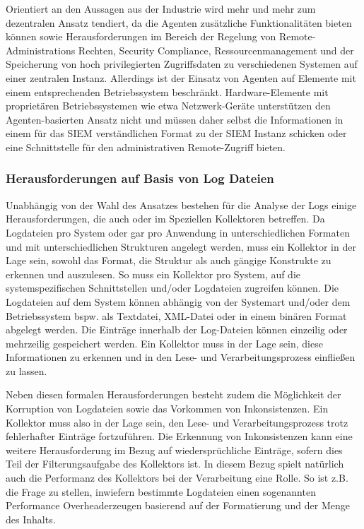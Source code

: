 Orientiert an den Aussagen aus der Industrie wird mehr und mehr zum dezentralen Ansatz tendiert, da die Agenten zusätzliche Funktionalitäten bieten können sowie Herausforderungen im Bereich der Regelung von Remote-Administrations Rechten, Security Compliance, Ressourcenmanagement und der Speicherung von hoch privilegierten Zugriffsdaten zu verschiedenen Systemen auf einer zentralen Instanz. Allerdings ist der Einsatz von Agenten auf Elemente mit einem entsprechenden Betriebssystem beschränkt. Hardware-Elemente mit proprietären Betriebssystemen wie etwa Netzwerk-Geräte unterstützen den Agenten-basierten Ansatz nicht und müssen daher selbst die Informationen in einem für das SIEM verständlichen Format zu der SIEM Instanz schicken oder eine Schnittstelle für den administrativen Remote-Zugriff bieten.


\subsubsection{Herausforderungen auf Basis von Log Dateien}
Unabhängig von der Wahl des Ansatzes bestehen für die Analyse der Logs einige Herausforderungen, die auch oder im Speziellen Kollektoren betreffen. Da Logdateien pro System oder gar pro Anwendung in unterschiedlichen Formaten und mit unterschiedlichen Strukturen angelegt werden, muss ein Kollektor in der Lage sein, sowohl das Format, die Struktur als auch gängige Konstrukte zu erkennen und auszulesen. So muss ein Kollektor pro System, auf die systemspezifischen Schnittstellen und/oder Logdateien zugreifen können. Die Logdateien auf dem System können abhängig von der Systemart und/oder dem Betriebssystem bspw. als Textdatei, XML-Datei oder in einem binären Format abgelegt werden. Die Einträge innerhalb der Log-Dateien können einzeilig oder mehrzeilig gespeichert werden. Ein Kollektor muss in der Lage sein, diese Informationen zu erkennen und in den Lese- und Verarbeitungsprozess einfließen zu lassen. 

Neben diesen formalen Herausforderungen besteht zudem die Möglichkeit der Korruption von Logdateien sowie das Vorkommen von Inkonsistenzen. Ein Kollektor muss also in der Lage sein, den Lese- und Verarbeitungsprozess trotz fehlerhafter Einträge fortzuführen. Die Erkennung von Inkonsistenzen kann eine weitere Herausforderung im Bezug auf wiedersprüchliche Einträge, sofern dies Teil der Filterungsaufgabe des Kollektors ist. In diesem Bezug spielt natürlich auch die Performanz des Kollektors bei der Verarbeitung eine Rolle. So ist z.B. die Frage zu stellen, inwiefern bestimmte Logdateien einen sogenannten \glqq Performance Overhead\grqq  erzeugen basierend auf der Formatierung und der Menge des Inhalts.


